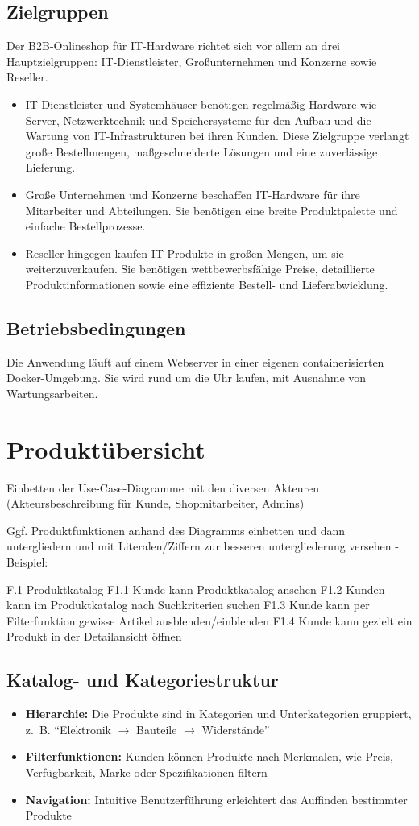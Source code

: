\documentclass[%
	ngerman,
	12pt,
	a4paper,
	oneside,
	parskip=full
]{scrbook}
\begin{document}
\section{Zielgruppen}
Der B2B-Onlineshop für IT-Hardware richtet sich vor allem an drei Hauptzielgruppen:
IT-Dienstleister, Großunternehmen und Konzerne sowie Reseller.
\begin{itemize}
	\item IT-Dienstleister und Systemhäuser benötigen regelmäßig Hardware wie Server, Netzwerktechnik und Speichersysteme für den Aufbau und die Wartung von IT-Infrastrukturen bei ihren Kunden.
	Diese Zielgruppe verlangt große Bestellmengen, maßgeschneiderte Lösungen und eine zuverlässige Lieferung.
	\item Große Unternehmen und Konzerne beschaffen IT-Hardware für ihre Mitarbeiter und Abteilungen.
	Sie benötigen eine breite Produktpalette und einfache Bestellprozesse.
	\item Reseller hingegen kaufen IT-Produkte in großen Mengen, um sie weiterzuverkaufen.
	Sie benötigen wettbewerbsfähige Preise, detaillierte Produktinformationen sowie eine effiziente Bestell- und Lieferabwicklung.
\end{itemize}
\section{Betriebsbedingungen}
Die Anwendung läuft auf einem Webserver in einer eigenen containerisierten Docker-Umgebung.
Sie wird rund um die Uhr laufen, mit Ausnahme von Wartungsarbeiten.

\chapter{Produktübersicht}
Einbetten der Use-Case-Diagramme mit den diversen Akteuren (Akteursbeschreibung für Kunde, Shopmitarbeiter, Admins)

Ggf. Produktfunktionen anhand des Diagramms einbetten und dann untergliedern und mit Literalen/Ziffern zur besseren untergliederung versehen -
Beispiel:

F.1 Produktkatalog
F1.1 Kunde kann Produktkatalog ansehen
F1.2 Kunden kann im Produktkatalog nach Suchkriterien suchen
F1.3 Kunde kann per Filterfunktion gewisse Artikel ausblenden/einblenden
F1.4 Kunde kann gezielt ein Produkt in der Detailansicht öffnen


\section{Katalog- und Kategoriestruktur}
\begin{itemize}
	\item \textbf{Hierarchie:} Die Produkte sind in Kategorien und Unterkategorien gruppiert, z.~B. \enquote{Elektronik $\rightarrow$ Bauteile $\rightarrow$ Widerstände}
	\item \textbf{Filterfunktionen:} Kunden können Produkte nach Merkmalen, wie Preis, Verfügbarkeit, Marke oder Spezifikationen filtern
	\item \textbf{Navigation:} Intuitive Benutzerführung erleichtert das Auffinden bestimmter Produkte
\end{itemize}
\end{document}
